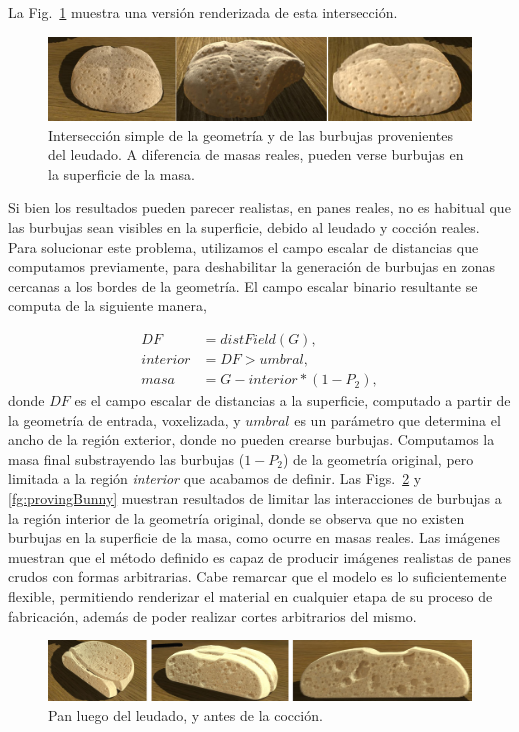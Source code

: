 \documentclass[spanish,a4paper,openright,11pt]{book}
\begin{document}
La Fig.~\ref{fg:intersectProblem} muestra una versión renderizada de esta intersección.

\begin{figure}
\includegraphics[width=15cm]{figures/intersectProblem}
\caption{Intersección simple de la geometría y de las burbujas provenientes del leudado. A diferencia de masas reales, pueden verse burbujas en la superficie de la masa.}
\label{fg:intersectProblem}
\end{figure}

Si bien los resultados pueden parecer realistas, en panes reales, no es habitual que las burbujas sean visibles en la superficie, debido al leudado y cocción reales.
Para solucionar este problema, utilizamos el campo escalar de distancias que computamos previamente, para deshabilitar la generación de burbujas en zonas cercanas a los bordes de la geometría.
El campo escalar binario resultante se computa de la siguiente manera,

\begin{align*}
DF    &= distField(G),\\
interior &= DF > umbral,\\
masa &= G - interior*(1-P_{2}),
\end{align*}
%
donde $DF$ es el campo escalar de distancias a la superficie, computado a partir de la geometría de entrada, voxelizada, y $umbral$ es un parámetro que determina el ancho de la región exterior, donde no pueden crearse burbujas.
Computamos la masa final substrayendo las burbujas ($1-P_{2}$) de la geometría original, pero limitada a la región {\em interior} que acabamos de definir. Las Figs.~\ref{fg:proving} y \ref{fg:provingBunny} muestran resultados de limitar las interacciones de burbujas a la región interior de la geometría original, donde se observa que no existen burbujas en la superficie de la masa, como ocurre en masas reales.
Las imágenes muestran que el método definido es capaz de producir imágenes realistas de panes crudos con formas arbitrarias.
Cabe remarcar que el modelo es lo suficientemente flexible, permitiendo renderizar el material en cualquier etapa de su proceso de fabricación, además de poder realizar cortes arbitrarios del mismo.

\begin{figure}
\includegraphics[width=15cm]{figures/prebakebread}
\caption{Pan luego del leudado, y antes de la cocción.}
\label{fg:proving}
\end{figure}
\end{document}
